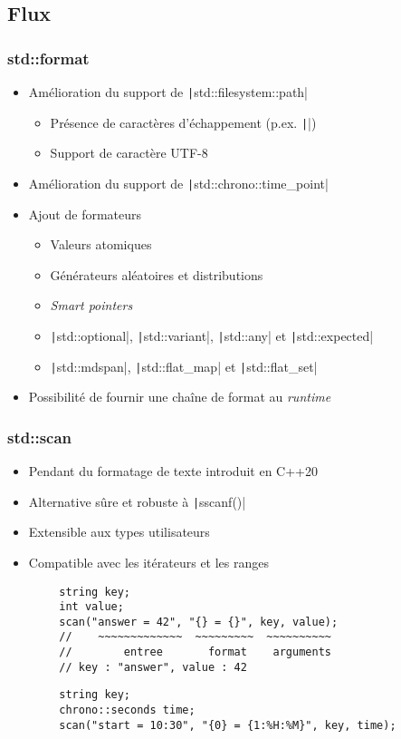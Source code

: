 \documentclass[C++.tex]{subfiles}
\begin{document}
\subsection*{Flux}
\begin{frame}[fragile]
	\frametitle{{\NoAutoSpacing std::format}}
	\begin{itemize}
		\item Amélioration du support de \texttt|std::filesystem::path|
		\begin{itemize}
			\item Présence de caractères d'échappement (p.ex. \texttt|\n|)
			\item Support de caractère UTF-8
		\end{itemize}
		\item Amélioration du support de \texttt|std::chrono::time_point|
		\item Ajout de formateurs
		\begin{itemize}
			\item Valeurs atomiques
			\item Générateurs aléatoires et distributions
			\item \textit{Smart pointers}
			\item \texttt|std::optional|, \texttt|std::variant|, \texttt|std::any| et \texttt|std::expected|
			\item \texttt|std::mdspan|, \texttt|std::flat_map| et \texttt|std::flat_set|
		\end{itemize}
		\item Possibilité de fournir une chaîne de format au \textit{runtime}
	\end{itemize}
\end{frame}

\begin{frame}[fragile]
	\frametitle{{\NoAutoSpacing std::scan}}
	\begin{itemize}
		\item Pendant du formatage de texte introduit en C++20
		\item Alternative sûre et robuste à \texttt|sscanf()|
		\item Extensible aux types utilisateurs
		\item Compatible avec les itérateurs et les ranges
	\end{itemize}

	\begin{verbatim}
		string key;
		int value;
		scan("answer = 42", "{} = {}", key, value);
		//    ~~~~~~~~~~~~~  ~~~~~~~~~  ~~~~~~~~~~
		//        entree       format    arguments
		// key : "answer", value : 42
	\end{verbatim}

	\begin{verbatim}
		string key;
		chrono::seconds time;
		scan("start = 10:30", "{0} = {1:%H:%M}", key, time);
	\end{verbatim}
\end{frame}
\end{document}
